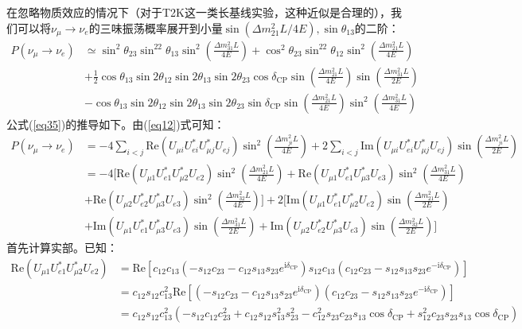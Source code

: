 \documentclass{article}
\newcommand{\ii}{\mathrm{i}}
\begin{document}
	在忽略物质效应的情况下（对于T2K这一类长基线实验，这种近似是合理的），我们可以将$\nu_\mu\to\nu_e$的三味振荡概率展开到小量$\sin(\Delta m_{21}^2L/4E),\sin\theta_{13}$的二阶：
	\begin{equation}
		\begin{aligned}P(\nu_\mu\to\nu_e)&\simeq\sin^2\theta_{23}\sin^22\theta_{13}\sin^2\left(\frac{\Delta m_{31}^2L}{4E}\right)+\cos^2\theta_{23}\sin^22\theta_{12}\sin^2\left(\frac{\Delta m_{21}^2L}{4E}\right)\\&+\frac{1}{2}\cos\theta_{13}\sin2\theta_{12}\sin2\theta_{13}\sin2\theta_{23}\cos\delta_{\mathrm{CP}}\sin\left(\frac{\Delta m_{21}^2L}{4E}\right)\sin\left(\frac{\Delta m_{31}^2L}{2E}\right)\\&-\cos\theta_{13}\sin2\theta_{12}\sin2\theta_{13}\sin2\theta_{23}\sin\delta_{\mathrm{CP}}\sin\left(\frac{\Delta m_{21}^2L}{4E}\right)\sin^2\left(\frac{\Delta m_{31}^2L}{4E}\right)\end{aligned}
		\label{eq35}
	\end{equation}
	公式(\ref{eq35})的推导如下。由(\ref{eq12})式可知：
	\begin{equation*}
		\begin{aligned}
			P(\nu_\mu\to\nu_e)&=-4\sum_{i<j}\mathrm{Re}(U_{\mu i}U_{ei}^*U_{\mu j}^*U_{ej})\sin^2\left(\frac{\Delta m_{ji}^2L}{4E}\right)+2\sum_{i<j}\mathrm{Im}(U_{\mu i}U_{ei}^*U_{\mu j}^*U_{ej})\sin\left(\frac{\Delta m_{ji}^2L}{2E}\right)\\
			&=-4\Bigg[\mathrm{Re}(U_{\mu 1}U_{e1}^*U_{\mu 2}^*U_{e2})\sin^2\left(\frac{\Delta m_{21}^2L}{4E}\right)+\mathrm{Re}(U_{\mu 1}U_{e1}^*U_{\mu 3}^*U_{e3})\sin^2\left(\frac{\Delta m_{31}^2L}{4E}\right)\\
			&+\mathrm{Re}(U_{\mu 2}U_{e2}^*U_{\mu 3}^*U_{e3})\sin^2\left(\frac{\Delta m_{32}^2L}{4E}\right)\Bigg]+2\Bigg[\mathrm{Im}(U_{\mu 1}U_{e1}^*U_{\mu 2}^*U_{e2})\sin\left(\frac{\Delta m_{21}^2L}{2E}\right)\\
			&+\mathrm{Im}(U_{\mu 1}U_{e1}^*U_{\mu 3}^*U_{e3})\sin\left(\frac{\Delta m_{31}^2L}{2E}\right)+\mathrm{Im}(U_{\mu 2}U_{e2}^*U_{\mu 3}^*U_{e3})\sin\left(\frac{\Delta m_{32}^2L}{2E}\right)\Bigg]
		\end{aligned}
	\end{equation*}
	首先计算实部。已知：
	\begin{equation*}
		\begin{aligned}
			\mathrm{Re}(U_{\mu 1}U_{e1}^*U_{\mu 2}^*U_{e2})&=\mathrm{Re}\left[c_{12}c_{13}(-s_{12}c_{23}-c_{12}s_{13}s_{23}e^{\ii\delta_{\mathrm{CP}}})s_{12}c_{13}(c_{12}c_{23}-s_{12}s_{13}s_{23}e^{-\ii\delta_{\mathrm{CP}}})\right]\\
			&=c_{12}s_{12}c_{13}^2\mathrm{Re}\left[(-s_{12}c_{23}-c_{12}s_{13}s_{23}e^{\ii\delta_{\mathrm{CP}}})(c_{12}c_{23}-s_{12}s_{13}s_{23}e^{-\ii\delta_{\mathrm{CP}}})\right]\\
			&=c_{12}s_{12}c_{13}^2(-s_{12}c_{12}c_{23}^2+c_{12}s_{12}s_{13}^2s_{23}^2-c_{12}^2s_{23}c_{23}s_{13}\cos\delta_\mathrm{CP}+s_{12}^2c_{23}s_{23}s_{13}\cos\delta_\mathrm{CP})
		\end{aligned}
	\end{equation*}
\end{document}
